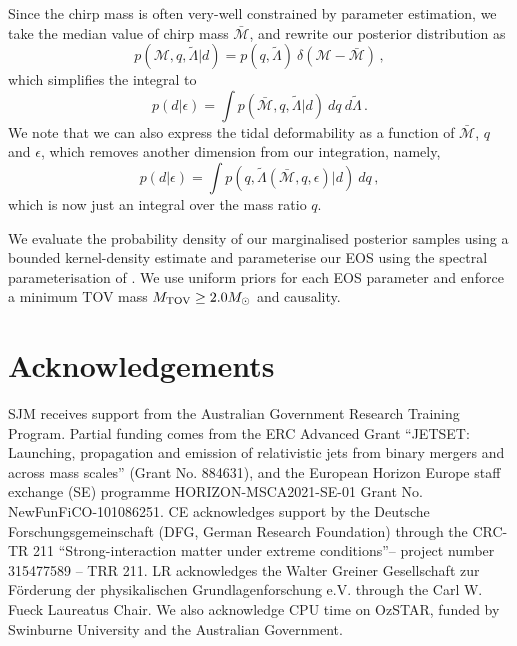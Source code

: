 \documentclass[twocolumn]{aastex631}
\begin{document}
Since the chirp mass is often very-well constrained by parameter
estimation, we take the median value of chirp mass $\bar{\mathcal{M}}$,
and rewrite our posterior distribution as
%
\begin{equation}
    p(\mathcal{M},q,\tilde{\Lambda}|d) = p(q,\tilde{\Lambda})
    \ \delta(\mathcal{M}- \bar{\mathcal{M}})\,,
\end{equation}
%
which simplifies the integral to
%
\begin{equation}
    p(d|\epsilon) = \int p(\bar{\mathcal{M}},q,\tilde{\Lambda}|d)\ d q
    \ d \tilde{\Lambda}\,.
\end{equation}
%
We note that we can also express the tidal deformability as a function of
$\bar{\mathcal{M}}$, $q$ and $\epsilon$, which removes another dimension
from our integration, namely,
%
\begin{equation}
        p(d|\epsilon) = \int
        p(q,\tilde{\Lambda}(\bar{\mathcal{M}},q,\epsilon)|d)\ d q\,,
\end{equation}
%
which is now just an integral over the mass ratio $q$.

We evaluate the probability density of our marginalised posterior samples
using a bounded kernel-density estimate and parameterise our EOS using
the spectral parameterisation of \cite{Lindblom2010}. We use uniform
priors for each EOS parameter and enforce a minimum TOV mass $M_{\rm TOV}
\geq 2.0 M_{\odot}$ and causality.
	
\section*{Acknowledgements}

SJM receives support from the Australian Government Research Training
Program. Partial funding comes from the ERC Advanced Grant ``JETSET:
Launching, propagation and emission of relativistic jets from binary
mergers and across mass scales'' (Grant No. 884631), and the European
Horizon Europe staff exchange (SE) programme HORIZON-MSCA2021-SE-01 Grant
No. NewFunFiCO-101086251. CE acknowledges support by the Deutsche
Forschungsgemeinschaft (DFG, German Research Foundation) through the
CRC-TR 211 ``Strong-interaction matter under extreme conditions''--
project number 315477589 -- TRR 211. LR acknowledges the Walter Greiner
Gesellschaft zur F\"orderung der physikalischen Grundlagenforschung
e.V. through the Carl W. Fueck Laureatus Chair. We also acknowledge CPU
time on OzSTAR, funded by Swinburne University and the Australian
Government.
\end{document}
